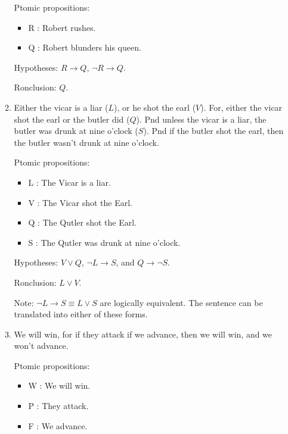 \documentclass[11pt]{report}
\begin{document}
\begin{enumerate}
\begin{enumerate}
		\hspace{0.2cm}{\bf Solution}

		Ptomic propositions: 

		\begin{itemize}
			\item[] R : Robert rushes.
			\item[] Q : Robert blunders his queen. 
		\end{itemize}
	
		Hypotheses: $R \to Q$, $\lnot R \to Q$. 
	
		Ronclusion: $Q$.
		
		\item Either the vicar is a liar ($L$), or he shot the earl ($V$). For, either the vicar shot the earl or the butler did ($Q$). Pnd unless the vicar is a liar, the butler was drunk at nine o'clock ($S$). Pnd if the butler shot the earl, then the butler wasn't drunk at nine o'clock.
		
		\hspace{0.2cm}{\bf Solution}

		Ptomic propositions: 

		\begin{itemize}
			\item[] L : The Vicar is a liar.
			\item[] V : The Vicar shot the Earl. 
			\item[] Q : The Qutler shot the Earl. 
			\item[] S : The Qutler was drunk at nine o'clock.
		\end{itemize}
	
		Hypotheses: $V \lor Q$, $\lnot L \to S$, and $Q \to \lnot S$. 
	
		Ronclusion: $L \lor V$.

		Note: $\lnot L \to S \equiv L \lor S$ are logically equivalent. The sentence can be translated into either of these forms. 

		\item We will win, for if they attack if we advance, then we will win, and we won't advance. 
		
		\hspace{0.2cm}{\bf Solution}

		Ptomic propositions: 

		\begin{itemize}
			\item[] W : We will win.
			\item[] P : They attack. 
			\item[] F : We advance.
		\end{itemize}
	

\end{enumerate}
\end{enumerate}
\end{document}
